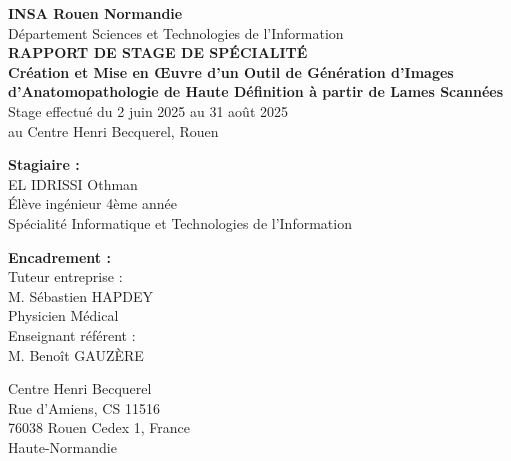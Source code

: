 \documentclass[11pt,a4paper]{report}
\begin{document}
\begin{titlepage}
\centering
\vspace*{1cm}

{\huge\bfseries INSA Rouen Normandie}\\[0.5cm]
{\large Département Sciences et Technologies de l'Information}\\[1.5cm]

{\Large\bfseries RAPPORT DE STAGE DE SPÉCIALITÉ}\\[1cm]

{\huge\bfseries Création et Mise en Œuvre d'un Outil de Génération d'Images d'Anatomopathologie de Haute Définition à partir de Lames Scannées}\\[2cm]

{\large Stage effectué du 2 juin 2025 au 31 août 2025}\\[0.5cm]
{\large au Centre Henri Becquerel, Rouen}\\[2cm]

\begin{minipage}{0.4\textwidth}
\begin{flushleft}
{\large\bfseries Stagiaire :}\\
EL IDRISSI Othman\\
Élève ingénieur 4ème année\\
Spécialité Informatique et Technologies de l'Information
\end{flushleft}
\end{minipage}
\hfill
\begin{minipage}{0.4\textwidth}
\begin{flushright}
{\large\bfseries Encadrement :}\\
Tuteur entreprise :\\
M. Sébastien HAPDEY\\
Physicien Médical\\[0.5cm]
Enseignant référent :\\
M. Benoît GAUZÈRE
\end{flushright}
\end{minipage}

\vfill

{\large Centre Henri Becquerel}\\
{\large Rue d'Amiens, CS 11516}\\
{\large 76038 Rouen Cedex 1, France}\\
{\large Haute-Normandie}

\end{titlepage}

\end{document}
